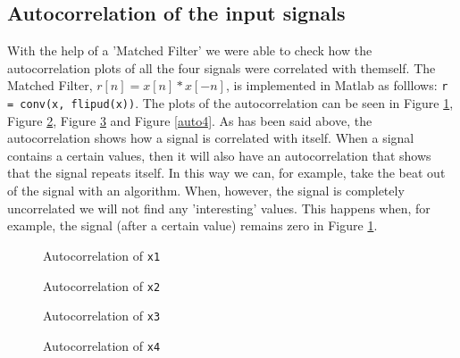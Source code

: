\documentclass[final]{scrreprt} %
\begin{document}
\subsection{Autocorrelation of the input signals}

With the help of a 'Matched Filter' we were able to check how the autocorrelation plots of all the four signals were correlated with themself.
The Matched Filter, $r[n]=x[n]*x[-n]$, is implemented in Matlab as folllows: \texttt{r = conv(x, flipud(x))}.
The plots of the autocorrelation can be seen in Figure \ref{fig:auto1}, Figure \ref{fig:auto2}, Figure \ref{fig:auto3} and Figure \ref{auto4}.
As has been said above, the autocorrelation shows how a signal is correlated with itself. 
When a signal contains a certain values, then it will also have an autocorrelation that shows that the signal repeats itself.
In this way we can, for example, take the beat out of the signal with an algorithm.
When, however, the signal is completely uncorrelated we will not find any 'interesting' values.
This happens when, for example, the signal (after a certain value) remains zero in Figure \ref{fig:auto1}.


\begin{figure}[H]
	\centering
    	\setlength\figureheight{6cm}
    	\setlength\figurewidth{10cm}
    	    	
    	\caption{Autocorrelation of \texttt{x1}}
    	\label{fig:auto1}
\end{figure}
\begin{figure}[H]
	\centering
    	\setlength\figureheight{6cm}
    	\setlength\figurewidth{10cm}
    	    	
    	\caption{Autocorrelation of \texttt{x2}}
    	\label{fig:auto2}
\end{figure}
\begin{figure}[H]
	\centering
    	\setlength\figureheight{6cm}
    	\setlength\figurewidth{10cm}
    	    	
    	\caption{Autocorrelation of \texttt{x3}}
    	\label{fig:auto3}
\end{figure}
\begin{figure}[H]
	\centering
    	\setlength\figureheight{6cm}
    	\setlength\figurewidth{10cm}
    	    	
    	\caption{Autocorrelation of \texttt{x4}}
    	\label{fig:auto4}
\end{figure}
\end{document}
